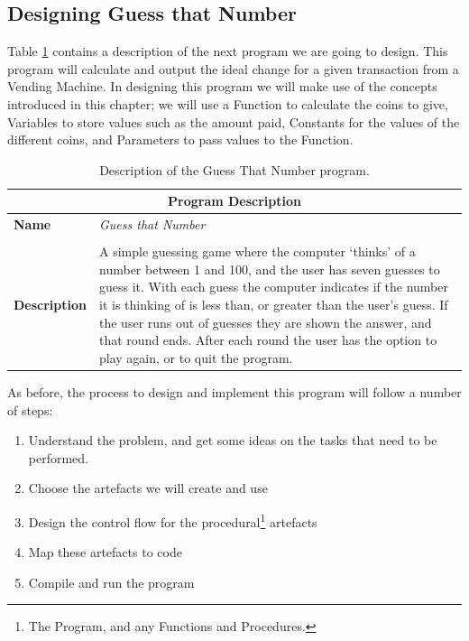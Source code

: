 \subsection{Designing Guess that Number} %
\label{sub:designing_guess_that_number}

Table \ref{tbl:control-flow-prog} contains a description of the next program we are going to design. This program will calculate and output the ideal change for a given transaction from a Vending Machine. In designing this program we will make use of the concepts introduced in this chapter; we will use a Function to calculate the coins to give, Variables to store values such as the amount paid, Constants for the values of the different coins, and Parameters to pass values to the Function.

\begin{table}[h]
\centering
\begin{tabular}{l|p{10cm}}
  \hline
  \multicolumn{2}{c}{\textbf{Program Description}} \\
  \hline
  \textbf{Name} & \emph{Guess that Number} \\
  \\
  \textbf{Description} & A simple guessing game where the computer `thinks' of a number between 1 and 100, and the user has seven guesses to guess it. With each guess the computer indicates if the number it is thinking of is less than, or greater than the user's guess. If the user runs out of guesses they are shown the answer, and that round ends. After each round the user has the option to play again, or to quit the program.\\
  \hline
\end{tabular}
\caption{Description of the Guess That Number program.}
\label{tbl:control-flow-prog}
\end{table}

As before, the process to design and implement this program will follow a number of steps:
\begin{enumerate}
  \item Understand the problem, and get some ideas on the tasks that need to be performed.
  \item Choose the artefacts we will create and use
  \item Design the control flow for the procedural\footnote{The Program, and any Functions and Procedures.} artefacts
  \item Map these artefacts to code
  \item Compile and run the program
\end{enumerate}

